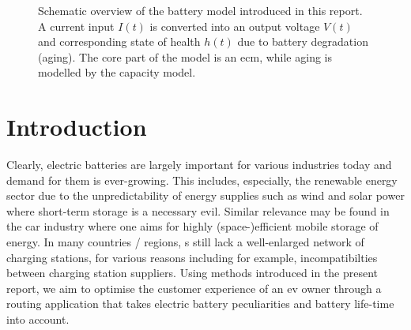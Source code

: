 \documentclass{prettytex/ox/mmsc-special-topic}
\title{\topictitle}
\author{Candidate \candidatenumber}
\date{\today}
\begin{document}
  \pagestyle{plain}
  \mmscSpecialHeader[casestudy]

  \begin{abstract}
    \label{abstract}
    This work will attempt to devise a mathematical model for Lithium-Ion batteries (cf. ) and, building on it, a model for an \gls{ev}.
    We implement the \gls{ev} model, which is just a first-order system of s, using known solvers as well as a numerical forward integration scheme.
    We will use the implemented numerical simulator to make progress in a complex route finding problem using real-world road network data fetched from OpenStreetMap.

    The first part of this report will focus on the model for the battery which was the focus of our project. The second part is the route finding and optimisation problem in the context of s.

    Our model was implemented in Python and MATLAB and there is a graphical user interface available with it that provides live insight into the model (cf. ).
  \end{abstract}

  \begin{figure}[H]
    \centering
    \caption{Schematic overview of the battery model introduced in this report. A current input $I(t)$ is converted into an output voltage $V(t)$ and corresponding state of health $h(t)$ due to battery degradation (aging). The core part of the model is an \gls{ecm}, while aging is modelled by the capacity model.}
    \label{fig:model-overview}
  \end{figure}


  \pagebreak
  \pagestyle{normal}

  \section{Introduction}
  Clearly, electric batteries are largely important for various industries today and demand for them is ever-growing.
  This includes, especially, the renewable energy sector due to the unpredictability of energy supplies such as wind and solar power where short-term storage is a necessary evil.
  Similar relevance may be found in the car industry where one aims for highly (space-)efficient mobile storage of energy.
  In many countries / regions, s still lack a well-enlarged network of charging stations, for various reasons including for example, incompatibilties between charging station suppliers.
  Using methods introduced in the present report, we aim to optimise the customer experience of an \gls{ev} owner through a routing application that takes electric battery peculiarities and battery life-time into account.
\end{document}
